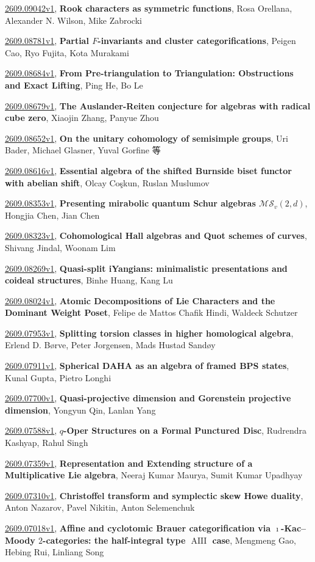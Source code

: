 \documentclass[9pt, a4paper]{article}
\theoremstyle{plain}
\theoremstyle{definition}
\theoremstyle{remark}
\newcommand{\arxiv}[3]{\href{https://arxiv.org/abs/#1}{#1}, \textbf{\textcolor{arxivblue}{#2}}, #3}
\begin{document}
\arxiv{2609.09042v1}{Rook characters as symmetric functions}{Rosa Orellana, Alexander N. Wilson, Mike Zabrocki}

\arxiv{2609.08781v1}{Partial $F$-invariants and cluster categorifications}{Peigen Cao, Ryo Fujita, Kota Murakami}

\arxiv{2609.08684v1}{From Pre-triangulation to Triangulation: Obstructions and Exact Lifting}{Ping He, Bo Le}

\arxiv{2609.08679v1}{The Auslander-Reiten conjecture for algebras with radical cube zero}{Xiaojin Zhang, Panyue Zhou}

\arxiv{2609.08652v1}{On the unitary cohomology of semisimple groups}{Uri Bader, Michael Glasner, Yuval Gorfine 等}

\arxiv{2609.08616v1}{Essential algebra of the shifted Burnside biset functor with abelian shift}{Olcay Coşkun, Ruslan Muslumov}

\arxiv{2609.08353v1}{Presenting mirabolic quantum Schur algebras $\mathcal{MS}_v(2,d)$}{Hongjia Chen, Jian Chen}

\arxiv{2609.08323v1}{Cohomological Hall algebras and Quot schemes of curves}{Shivang Jindal, Woonam Lim}

\arxiv{2609.08269v1}{Quasi-split iYangians: minimalistic presentations and coideal structures}{Binhe Huang, Kang Lu}

\arxiv{2609.08024v1}{Atomic Decompositions of Lie Characters and the Dominant Weight Poset}{Felipe de Mattos Chafik Hindi, Waldeck Schutzer}

\arxiv{2609.07953v1}{Splitting torsion classes in higher homological algebra}{Erlend D. Børve, Peter Jorgensen, Mads Hustad Sandøy}

\arxiv{2609.07911v1}{Spherical DAHA as an algebra of framed BPS states}{Kunal Gupta, Pietro Longhi}

\arxiv{2609.07700v1}{Quasi-projective dimension and Gorenstein projective dimension}{Yongyun Qin, Lanlan Yang}

\arxiv{2609.07588v1}{$q$-Oper Structures on a Formal Punctured Disc}{Rudrendra Kashyap, Rahul Singh}

\arxiv{2609.07359v1}{Representation and Extending structure of a Multiplicative Lie algebra}{Neeraj Kumar Maurya, Sumit Kumar Upadhyay}

\arxiv{2609.07310v1}{Christoffel transform and symplectic skew Howe duality}{Anton Nazarov, Pavel Nikitin, Anton Selemenchuk}

\arxiv{2609.07018v1}{Affine and cyclotomic Brauer categorification via $\imath$-Kac--Moody $2$-categories: the half-integral type $\operatorname{AIII}$ case}{Mengmeng Gao, Hebing Rui, Linliang Song}
\end{document}
